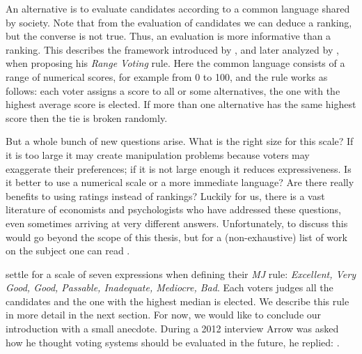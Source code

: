 An alternative is to evaluate candidates according to a common language shared by society. Note that from the evaluation of candidates we can deduce a ranking, but the converse is not true. Thus, an evaluation is more informative than a ranking.
This describes the framework introduced by \citet{Smith2000}, and later analyzed by \citet{Pivato2014,Gaertner2012,Zahid2015}, when proposing his \textit{Range Voting} rule.
Here the common language consists of a range of numerical scores, for example from 0 to 100, and the rule works as follows: each voter assigns a score to all or some alternatives, the one with the highest average score is elected. If more than one alternative has the same highest score then the tie is broken randomly.

But a whole bunch of new questions arise. What is the right size for this scale? If it is too large it may create manipulation problems because voters may exaggerate their preferences; if it is not large enough it reduces expressiveness. Is it better to use a numerical scale or a more immediate language? Are there really benefits to using ratings instead of rankings? 
Luckily for us, there is a vast literature of economists and psychologists who have addressed these questions, even sometimes arriving at very different answers. Unfortunately, to discuss this would go beyond the scope of this thesis, but for a (non-exhaustive) list of work on the subject one can read \citet{Cox1980,Sparling2011,Churchill1984,Preston2000,Maio1996}.

\citet{Balinski2007} settle for a scale of seven expressions when defining their \textit{\acl{MJ}} rule: \textit{Excellent, Very Good, Good, Passable, Inadequate, Mediocre, Bad}. Each voters judges all the candidates and the one with the highest median is elected. We describe this rule in more detail in the next section.
For now, we would like to conclude our introduction with a small anecdote. During a 2012 interview Arrow was asked how he thought voting systems should be evaluated in the future, he replied:  \citep{PodcastArrow}.


